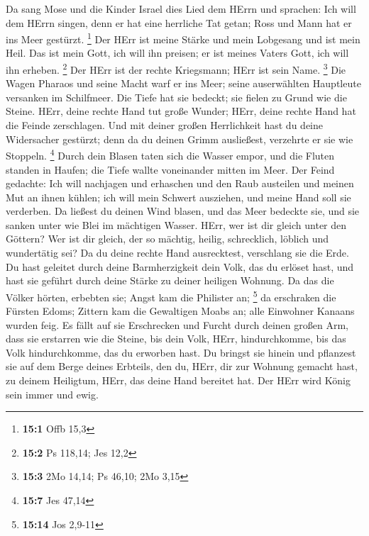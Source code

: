  Da sang Mose und die Kinder Israel dies Lied dem HErrn
und sprachen: Ich will dem HErrn singen, denn er hat eine herrliche Tat
getan; Ross und Mann hat er ins Meer gestürzt. \footnote{\textbf{15:1}
  Offb 15,3}  Der HErr ist meine Stärke und mein Lobgesang
und ist mein Heil. Das ist mein Gott, ich will ihn preisen; er ist
meines Vaters Gott, ich will ihn erheben. \footnote{\textbf{15:2} Ps
  118,14; Jes 12,2}  Der HErr ist der rechte Kriegsmann;
HErr ist sein Name. \footnote{\textbf{15:3} 2Mo 14,14; Ps 46,10; 2Mo
  3,15}  Die Wagen Pharaos und seine Macht warf er ins
Meer; seine auserwählten Hauptleute versanken im Schilfmeer.
 Die Tiefe hat sie bedeckt; sie fielen zu Grund wie die
Steine.  HErr, deine rechte Hand tut große Wunder; HErr,
deine rechte Hand hat die Feinde zerschlagen.  Und mit
deiner großen Herrlichkeit hast du deine Widersacher gestürzt; denn da
du deinen Grimm ausließest, verzehrte er sie wie Stoppeln. \footnote{\textbf{15:7}
  Jes 47,14}  Durch dein Blasen taten sich die Wasser
empor, und die Fluten standen in Haufen; die Tiefe wallte voneinander
mitten im Meer.  Der Feind gedachte: Ich will nachjagen
und erhaschen und den Raub austeilen und meinen Mut an ihnen kühlen; ich
will mein Schwert ausziehen, und meine Hand soll sie verderben.
 Da ließest du deinen Wind blasen, und das Meer bedeckte
sie, und sie sanken unter wie Blei im mächtigen Wasser. 
HErr, wer ist dir gleich unter den Göttern? Wer ist dir gleich, der so
mächtig, heilig, schrecklich, löblich und wundertätig sei?
 Da du deine rechte Hand ausrecktest, verschlang sie die
Erde.  Du hast geleitet durch deine Barmherzigkeit dein
Volk, das du erlöset hast, und hast sie geführt durch deine Stärke zu
deiner heiligen Wohnung.  Da das die Völker hörten,
erbebten sie; Angst kam die Philister an; \footnote{\textbf{15:14} Jos
  2,9-11}  da erschraken die Fürsten Edoms; Zittern kam
die Gewaltigen Moabs an; alle Einwohner Kanaans wurden feig.
 Es fällt auf sie Erschrecken und Furcht durch deinen
großen Arm, dass sie erstarren wie die Steine, bis dein Volk, HErr,
hindurchkomme, bis das Volk hindurchkomme, das du erworben hast.
 Du bringst sie hinein und pflanzest sie auf dem Berge
deines Erbteils, den du, HErr, dir zur Wohnung gemacht hast, zu deinem
Heiligtum, HErr, das deine Hand bereitet hat.  Der HErr
wird König sein immer und ewig.

